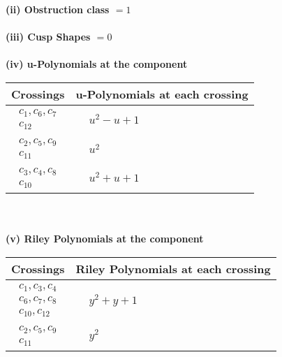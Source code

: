 \documentclass[1p]{elsarticle_modified}
\theoremstyle{definition}
\begin{document}
\flushleft \textbf{(ii) Obstruction class $= 1$}\\~\\
\flushleft \textbf{(iii) Cusp Shapes $= 0$}\\~\\
\newpage\renewcommand{\arraystretch}{1}
\flushleft \textbf{(iv) u-Polynomials at the component}\newline \\
\begin{tabular}{m{50pt}|m{274pt}}
Crossings & \hspace{64pt}u-Polynomials at each crossing \\
\hline $$\begin{aligned}c_{1},c_{6},c_{7}\\c_{12}\end{aligned}$$&$\begin{aligned}
&u^2- u+1
\end{aligned}$\\
\hline $$\begin{aligned}c_{2},c_{5},c_{9}\\c_{11}\end{aligned}$$&$\begin{aligned}
&u^2
\end{aligned}$\\
\hline $$\begin{aligned}c_{3},c_{4},c_{8}\\c_{10}\end{aligned}$$&$\begin{aligned}
&u^2+u+1
\end{aligned}$\\
\hline
\end{tabular}\\~\\
\newpage\renewcommand{\arraystretch}{1}
\flushleft \textbf{(v) Riley Polynomials at the component}\newline \\
\begin{tabular}{m{50pt}|m{274pt}}
Crossings & \hspace{64pt}Riley Polynomials at each crossing \\
\hline $$\begin{aligned}c_{1},c_{3},c_{4}\\c_{6},c_{7},c_{8}\\c_{10},c_{12}\end{aligned}$$&$\begin{aligned}
&y^2+y+1
\end{aligned}$\\
\hline $$\begin{aligned}c_{2},c_{5},c_{9}\\c_{11}\end{aligned}$$&$\begin{aligned}
&y^2
\end{aligned}$\\
\hline
\end{tabular}\\~\\
\end{document}
